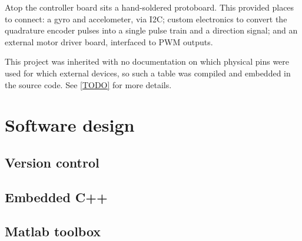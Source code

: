 \documentclass[main.tex]{subfiles}
\begin{document}
	Atop the controller board sits a hand-soldered protoboard. This provided places to connect: a gyro and accelometer, via I2C; custom electronics to convert the quadrature encoder pulses into a single pulse train and a direction signal; and an external motor driver board, interfaced to PWM outputs.

	This project was inherited with no documentation on which physical pins were used for which external devices, so such a table was compiled and embedded in the source code. See \cref{TODO} for more details.

\section{Software design}

	\subsection{Version control}

	\subsection{Embedded C++}

	\subsection{Matlab toolbox}
\end{document}
